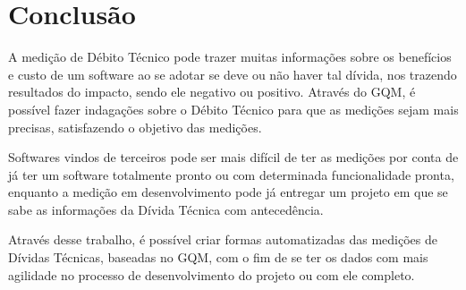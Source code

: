 \chapter[Conclusão]{Conclusão}
A medição de Débito Técnico pode trazer muitas informações sobre os benefícios e custo de um software ao 
se adotar se deve ou não haver tal dívida, nos trazendo resultados do impacto, sendo ele negativo ou positivo. Através do GQM, é possível fazer indagações sobre o Débito Técnico para que as medições sejam mais precisas, satisfazendo o objetivo das medições.


Softwares vindos de terceiros pode ser mais difícil de ter as medições por conta de já ter um software totalmente pronto ou com determinada funcionalidade pronta, enquanto a medição em desenvolvimento pode já entregar um projeto em que se sabe as informações da Dívida Técnica com antecedência.


Através desse trabalho, é possível criar formas automatizadas das medições de Dívidas Técnicas, baseadas no GQM, com o fim de se ter os dados com mais agilidade no processo de desenvolvimento do projeto ou com ele completo.
